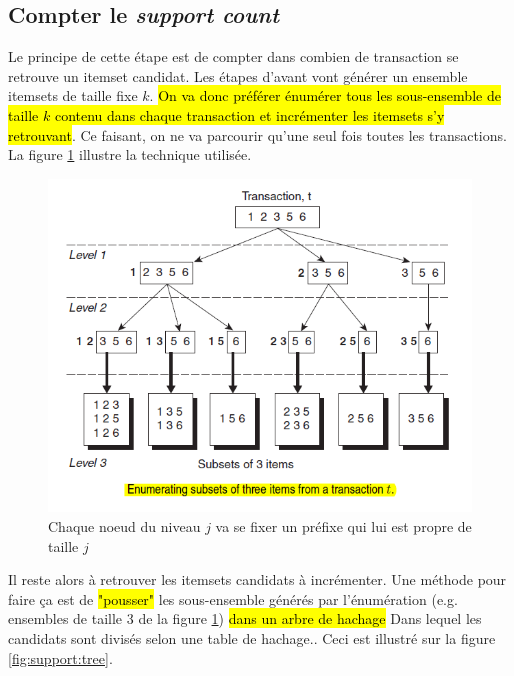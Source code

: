 \documentclass[letterpaper, 12pt]{article}
\newcommand{\alinea}{
\hspace*{0.5cm}}
\begin{document}
		\subsection{Compter le \textit{support count}}\label{sec:apriori:count}
			\alinea Le principe de cette étape est de compter dans combien de
				transaction se retrouve un itemset candidat. Les étapes
				d'avant vont générer un ensemble itemsets de taille fixe $k$.
				\hl{On va donc préférer énumérer tous les sous-ensemble 
				de taille
				$k$ contenu dans chaque transaction et incrémenter les
				itemsets s'y retrouvant}. Ce faisant, on ne va
				parcourir qu'une seul fois toutes les transactions.
				La figure \ref{fig:support:count} illustre la technique 
				utilisée.
			\begin{figure}[H]
				\centering
				\includegraphics[scale=0.75]{Images/support_count}
				\caption{Chaque noeud du niveau $j$ va se fixer un préfixe
						 qui lui est propre de taille $j$}
				\label{fig:support:count}
			\end{figure}\noindent
			Il reste alors à retrouver les itemsets candidats à incrémenter.
			Une méthode pour faire ça est de \hl{"pousser"} les sous-ensemble
			générés par l'énumération (e.g. ensembles de taille 3 de la 
			figure \ref{fig:support:count}) \hl{dans un arbre de hachage}
			Dans lequel les candidats sont divisés selon une table de hachage..
			Ceci est illustré sur la figure \ref{fig:support:tree}.
\end{document}
